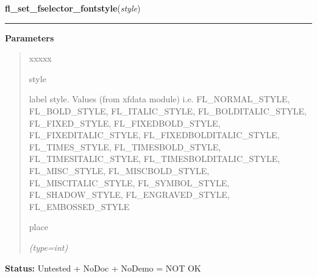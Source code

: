 \hspace{.8\funcindent}\begin{boxedminipage}{\funcwidth}

    \raggedright \textbf{fl\_set\_fselector\_fontstyle}(\textit{style})

    \vspace{-1.5ex}

    \rule{\textwidth}{0.5\fboxrule}
\setlength{\parskip}{2ex}
\setlength{\parskip}{1ex}
      \textbf{Parameters}
      \vspace{-1ex}

      \begin{quote}
        \begin{Ventry}{xxxxx}

          \item[style]

          label style. Values (from xfdata module) i.e. FL\_NORMAL\_STYLE, 
          FL\_BOLD\_STYLE, FL\_ITALIC\_STYLE, FL\_BOLDITALIC\_STYLE, 
          FL\_FIXED\_STYLE, FL\_FIXEDBOLD\_STYLE, FL\_FIXEDITALIC\_STYLE, 
          FL\_FIXEDBOLDITALIC\_STYLE, FL\_TIMES\_STYLE, 
          FL\_TIMESBOLD\_STYLE, FL\_TIMESITALIC\_STYLE, 
          FL\_TIMESBOLDITALIC\_STYLE, FL\_MISC\_STYLE, FL\_MISCBOLD\_STYLE,
          FL\_MISCITALIC\_STYLE, FL\_SYMBOL\_STYLE, FL\_SHADOW\_STYLE, 
          FL\_ENGRAVED\_STYLE, FL\_EMBOSSED\_STYLE

          \item[place]

            {\it (type=int)}

        \end{Ventry}

      \end{quote}

\textbf{Status:} Untested + NoDoc + NoDemo = NOT OK



    \end{boxedminipage}

    \label{xformslib:flgoodies:fl_set_fselector_placement}

    \vspace{0.5ex}

